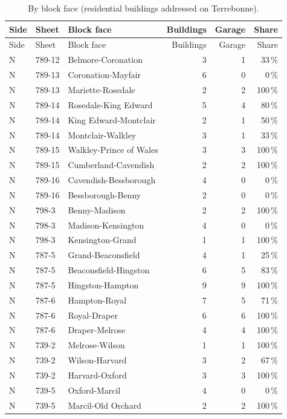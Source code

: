 \documentclass[11pt]{article}
\begin{document}
\begin{longtable}{llp{5.2cm}rrr}
\caption{By block face (residential buildings addressed on Terrebonne).}\\\toprule
Side & Sheet & Block face & Buildings & Garage & Share\\\midrule\endfirsthead
\toprule Side & Sheet & Block face & Buildings & Garage & Share\\\midrule\endhead
N & 789-12 & Belmore-Coronation & 3 & 1 & 33\,\% \\
N & 789-13 & Coronation-Mayfair & 6 & 0 & 0\,\% \\
N & 789-13 & Mariette-Rosedale & 2 & 2 & 100\,\% \\
N & 789-14 & Rosedale-King Edward & 5 & 4 & 80\,\% \\
N & 789-14 & King Edward-Montclair & 2 & 1 & 50\,\% \\
N & 789-14 & Montclair-Walkley & 3 & 1 & 33\,\% \\
N & 789-15 & Walkley-Prince of Wales & 3 & 3 & 100\,\% \\
N & 789-15 & Cumberland-Cavendish & 2 & 2 & 100\,\% \\
N & 789-16 & Cavendish-Bessborough & 4 & 0 & 0\,\% \\
N & 789-16 & Bessborough-Benny & 2 & 0 & 0\,\% \\
N & 798-3 & Benny-Madison & 2 & 2 & 100\,\% \\
N & 798-3 & Madison-Kensington & 4 & 0 & 0\,\% \\
N & 798-3 & Kensington-Grand & 1 & 1 & 100\,\% \\
N & 787-5 & Grand-Beaconsfield & 4 & 1 & 25\,\% \\
N & 787-5 & Beaconsfield-Hingston & 6 & 5 & 83\,\% \\
N & 787-5 & Hingston-Hampton & 9 & 9 & 100\,\% \\
N & 787-6 & Hampton-Royal & 7 & 5 & 71\,\% \\
N & 787-6 & Royal-Draper & 6 & 6 & 100\,\% \\
N & 787-6 & Draper-Melrose & 4 & 4 & 100\,\% \\
N & 739-2 & Melrose-Wilson & 1 & 1 & 100\,\% \\
N & 739-2 & Wilson-Harvard & 3 & 2 & 67\,\% \\
N & 739-2 & Harvard-Oxford & 3 & 3 & 100\,\% \\
N & 739-5 & Oxford-Marcil & 4 & 0 & 0\,\% \\
N & 739-5 & Marcil-Old Orchard & 2 & 2 & 100\,\% \\

\end{longtable}
\end{document}

